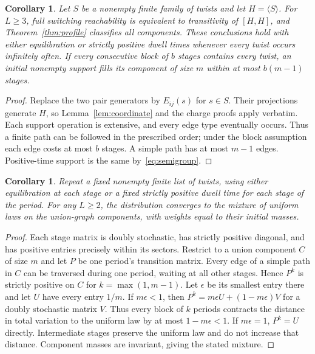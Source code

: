 \documentclass[11pt]{article}
\newtheorem{corollary}[theorem]{Corollary}
\theoremstyle{remark}
\begin{document}
\begin{corollary}\label{cor:family}
Let $S$ be a nonempty finite family of twists and let $H=\langle S\rangle$.
For $L\geq3$, full switching reachability is equivalent to transitivity of
$[H,H]$, and Theorem~\ref{thm:profile} classifies all components.
These conclusions hold with either equilibration or strictly positive dwell
times whenever every twist occurs infinitely often. If every consecutive
block of $b$ stages contains every twist, an initial nonempty support fills
its component of size $m$ within at most $b(m-1)$ stages.
\end{corollary}
\begin{proof}
Replace the two pair generators by $E_{ij}(s)$ for $s\in S$.
Their projections generate $H$, so Lemma~\ref{lem:coordinate} and the
charge proofs apply verbatim. Each support operation is extensive, and
every edge type eventually occurs. Thus a finite path can be followed in
the prescribed order; under the block assumption each edge costs at most
$b$ stages. A simple path has at most $m-1$ edges. Positive-time support
is the same by~\eqref{eq:semigroup}.
\end{proof}

\begin{corollary}\label{cor:limit}
Repeat a fixed nonempty finite list of twists, using either equilibration at each stage
or a fixed strictly positive dwell time for each stage of the period.
For any $L\geq2$, the distribution converges to the mixture of uniform laws
on the union-graph components, with weights equal to their initial masses.
\end{corollary}
\begin{proof}
Each stage matrix is doubly stochastic, has strictly positive diagonal,
and has positive entries precisely within its sectors. Restrict to a
union component $C$ of size $m$ and let $P$ be one period's transition matrix.
Every edge of a simple path in $C$ can be traversed during one period,
waiting at all other stages. Hence $P^k$ is strictly positive on $C$ for
$k=\max(1,m-1)$. Let $\epsilon$ be its smallest entry there and let $U$
have every entry $1/m$. If $m\epsilon<1$, then
$P^k=m\epsilon U+(1-m\epsilon)V$ for a doubly stochastic matrix $V$.
Thus every block of $k$ periods contracts the distance in total variation
to the uniform law by at most $1-m\epsilon<1$. If $m\epsilon=1$,
$P^k=U$ directly. Intermediate stages preserve the uniform law and do not
increase that distance. Component masses are invariant, giving the stated
mixture.
\end{proof}
\end{document}
